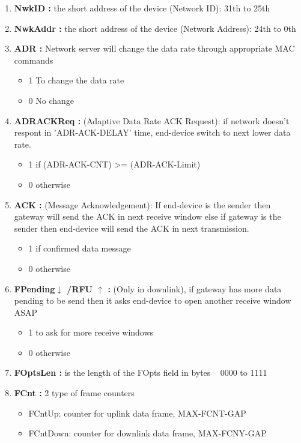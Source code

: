 \begin{landscape}
\begin{multicols}{2}
\begin{enumerate}
	\item \textbf{NwkID :} the short address of the device (Network ID): 31th to 25th
	\item \textbf{NwkAddr :} the short address of the device (Network Address): 24th to 0th
	\item \textbf{ADR :}  Network server will change the data rate through appropriate MAC commands
	\begin{itemize}
		\item 1  To change the data rate
		\item 0  No change
	\end{itemize}
	\item \textbf{ADRACKReq :} (Adaptive Data Rate ACK Request): if network doesn't respont in 'ADR-ACK-DELAY' time, end-device switch to next lower data rate.
	\begin{itemize}
		\item 1  if (ADR-ACK-CNT) >= (ADR-ACK-Limit)
		\item 0  otherwise
	\end{itemize}
	\item \textbf{ACK :} (Message Acknowledgement): If end-device is the sender then gateway will send the ACK in next receive window  else if gateway is the sender then end-device will send the ACK in next transmission.
	\begin{itemize}
		\item 1  if confirmed data message
		\item 0  otherwise
	\end{itemize}
	\item \textbf{FPending$\downarrow$ /RFU $\uparrow$ :} (Only in downlink), if gateway has more data pending to be send then it asks end-device to open another receive window ASAP
	\begin{itemize}
		\item 1  to ask for more receive windows
		\item 0  otherwise
	\end{itemize}
	\item \textbf{FOptsLen :} is the length of the FOpts field in bytes   0000 to 1111 
	\item \textbf{FCnt :}  2 type of frame counters 
	\begin{itemize}
		\item FCntUp:  counter for uplink data frame, MAX-FCNT-GAP
		\item FCntDown:  counter for downlink data frame, MAX-FCNY-GAP
	\end{itemize}  

\end{enumerate}
\end{multicols}
\end{landscape}

